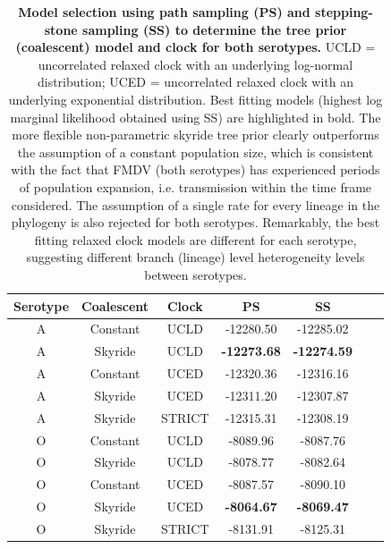 \documentclass[a4paper,10pt]{article}
\begin{document}
\newpage
\begin{table}[H]
\caption{\textbf{Model selection using path sampling (PS) and stepping-stone sampling (SS) to determine the tree prior (coalescent) model and clock for both serotypes.}
UCLD = uncorrelated relaxed clock with an underlying log-normal distribution; UCED = uncorrelated relaxed clock with an underlying exponential distribution.
Best fitting models (highest log marginal likelihood obtained using SS) are highlighted in bold.
The more flexible non-parametric skyride tree prior clearly outperforms the assumption of a constant population size, which is consistent with the fact that FMDV (both serotypes) has experienced periods of population expansion, i.e. transmission within the time frame considered.
The assumption of a single rate for every lineage in the phylogeny is also rejected for both serotypes.
Remarkably, the best fitting relaxed clock models are different for each serotype, suggesting different branch (lineage) level heterogeneity levels between serotypes.
}
\begin{center}
\begin{tabular}{ccccccc}
\toprule
Serotype	& Coalescent	& Clock	& PS  & SS\\             
\midrule
A	& Constant	 & UCLD	& -12280.50& -12285.02\\
A	& Skyride 	& UCLD	& \textbf{-12273.68} & \textbf{-12274.59}\\
A	& Constant	 & UCED	& -12320.36 & -12316.16\\
A	& Skyride 	& UCED	& -12311.20 & -12307.87\\
A       & Skyride       & STRICT & -12315.31 & -12308.19\\
O	& Constant	& UCLD	& -8089.96& -8087.76\\
O	& Skyride 	& UCLD	& -8078.77 & -8082.64\\
O	& Constant	& UCED	&-8087.57 & -8090.10\\
O	& Skyride 	& UCED	& \textbf{-8064.67}& \textbf{-8069.47}\\
O       & Skyride       & STRICT & -8131.91& -8125.31\\
\bottomrule
\end{tabular}
\end{center}
\begin{flushleft}
\end{flushleft}
\label{stab:treeclockselection}
 \end{table}
\end{document}
